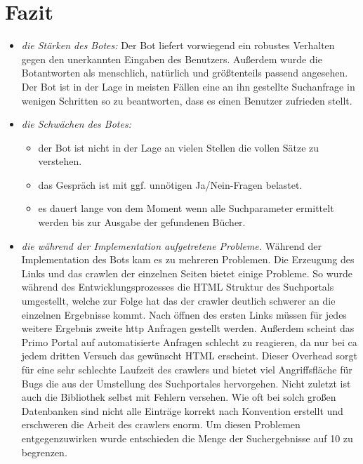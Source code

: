\documentclass[12pt,a4paper]{scrartcl}
\begin{document}
\section{Fazit}
\begin{itemize}
\item \textit{die Stärken des Botes: }\newline
Der Bot liefert vorwiegend ein robustes Verhalten gegen den unerkannten Eingaben des Benutzers. Außerdem wurde die Botantworten als menschlich, natürlich und größtenteils passend angesehen. Der Bot ist in der Lage in meisten Fällen eine an ihn gestellte Suchanfrage in wenigen Schritten so zu beantworten, dass es einen Benutzer zufrieden stellt. 
\item \textit{die Schwächen des Botes: }
\begin{itemize}
\item der Bot ist nicht in der Lage an vielen Stellen die vollen Sätze zu verstehen.
\item das Gespräch ist mit ggf. unnötigen Ja/Nein-Fragen belastet.
\item es dauert lange von dem Moment wenn alle Suchparameter ermittelt werden bis zur Ausgabe der gefundenen Bücher.
\end{itemize}
\item \textit{die während der Implementation aufgetretene Probleme.} \newline
Während der Implementation des Bots kam es zu mehreren Problemen. Die Erzeugung des Links und das crawlen der einzelnen Seiten bietet einige Probleme. So wurde während des Entwicklungsprozesses die HTML Struktur des Suchportals umgestellt, welche zur Folge hat das der crawler deutlich schwerer an die einzelnen Ergebnisse kommt. Nach öffnen des ersten Links müssen für jedes weitere Ergebnis zweite http Anfragen gestellt werden. Außerdem scheint das Primo Portal auf automatisierte Anfragen schlecht zu reagieren, da nur bei ca jedem dritten Versuch das
gewünscht HTML erscheint. Dieser Overhead sorgt für eine sehr schlechte Laufzeit des crawlers und bietet viel Angriffsfläche für Bugs die aus der Umstellung des Suchportales hervorgehen. Nicht zuletzt ist auch die Bibliothek selbst mit Fehlern versehen. Wie oft bei solch großen Datenbanken sind nicht alle Einträge korrekt nach Konvention erstellt und erschweren die Arbeit des crawlers enorm. Um diesen Problemen entgegenzuwirken wurde entschieden die Menge der Suchergebnisse auf 10 zu begrenzen.\newline

\end{itemize}
\end{document}
